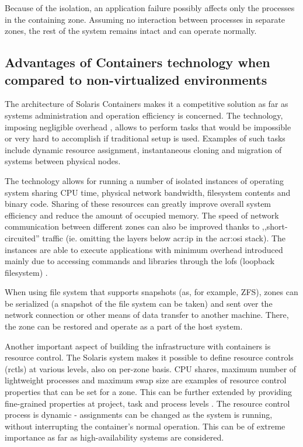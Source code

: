 \documentclass[11pt]{book}
\begin{document}
        Because of the isolation, an application failure possibly affects only the processes in the containing zone.
        Assuming no interaction between processes in separate zones, the rest of the system remains intact and can
        operate normally.
        
      

      \subsection{Advantages of Containers technology when compared to non-virtualized environments}
      \label{sub:}

        The architecture of Solaris Containers makes it a competitive solution as far as systems administration and
        operation efficiency is concerned. The technology, imposing negligible overhead \cite{price}, allows to perform
        tasks that would be impossible or very hard to accomplish if traditional setup is used. Examples of such tasks
        include dynamic resource assignment, instantaneous cloning and migration of systems between physical nodes.

        The technology allows for running a number of isolated instances of operating system sharing CPU time, physical
        network bandwidth, filesystem contents and binary code. Sharing of these resources can greatly improve overall
        system efficiency and reduce the amount of occupied memory. The speed of network communication between different
        zones can also be improved thanks to ,,short-circuited'' traffic (ie. omitting the layers below \gls{acr:ip} in
        the \gls{acr:osi} stack). The instances are able to execute applications with minimum overhead introduced mainly
        due to accessing commands and libraries through the lofs (loopback filesystem) \cite{price,fsag}.

        When using file system that supports snapshots (as, for example, ZFS), zones can be serialized (a snapshot of
        the file system can be taken) and sent over the network connection or other means of data transfer to another
        machine. There, the zone can be restored and operate as a part of the host system.

        Another important aspect of building the infrastructure with containers is resource control. The Solaris system
        makes it possible to define resource controls (rctls) at various levels, also on per-zone basis. CPU shares,
        maximum number of lightweight processes and maximum swap size are examples of resource control properties that
        can be set for a zone. This can be further extended by providing fine-grained properties at project, task and
        process levels \cite{sag}. The resource control process is dynamic - assignments can be changed as the system is
        running, without interrupting the container's normal operation. This can be of extreme importance as far as
        high-availability systems are considered.
\end{document}
